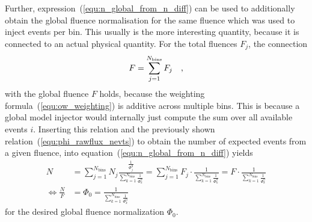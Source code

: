 Further, expression~(\ref{equ:n_global_from_n_diff}) can be used to additionally obtain the global fluence normalisation for the same fluence which was used to inject events per bin.
This usually is the more interesting quantity, because it is connected to an actual physical quantity.
For the total fluences $F_j$, the connection
\begin{equation}
  F = \sum_{j=1}^{N_\text{bins}} F_j
  \quad\text{,}
\end{equation}
with the global fluence $F$ holds, because the weighting formula~(\ref{equ:ow_weighting}) is additive across multiple bins.
This is because a global model injector would internally just compute the sum over all available events $i$.
Inserting this relation and the previously shown relation~(\ref{equ:phi_rawflux_nevts}) to obtain the number of expected events from a given fluence, into equation~(\ref{equ:n_global_from_n_diff}) yields
\begin{align}
  \label{equ:phi_global_from_phi_diff}
  N &= \sum_{j=1}^{N_\text{bins}} N_j
      \frac{\frac{1}{\Phi_j^0}}{\sum_{k=1}^{N_\text{bins}} \frac{1}{\Phi_k^0}}
    = \sum_{j=1}^{N_\text{bins}} F_j \cdot \frac{1}{\sum_{k=1}^{N_\text{bins}} \frac{1}{\Phi_k^0}}
    = F \cdot \frac{1}{\sum_{k=1}^{N_\text{bins}} \frac{1}{\Phi_k^0}} \\
  \Leftrightarrow
  \frac{N}{F} &= \Phi_0 = \frac{1}{\sum_{k=1}^{N_\text{bins}} \frac{1}{\Phi_k^0}}
\end{align}
for the desired global fluence normalization $\Phi_0$.


